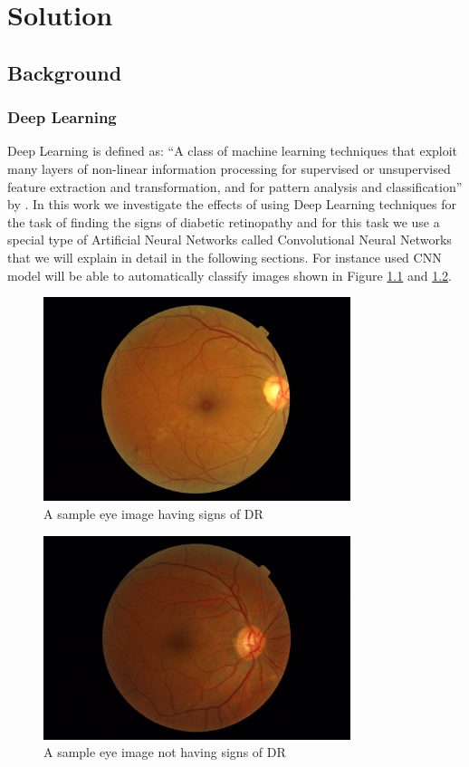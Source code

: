 \chapter{Solution}

\section{Background}
\subsection{Deep Learning}
Deep Learning is defined as:
``A class of machine learning techniques that exploit many layers of non-linear information processing for supervised or unsupervised feature extraction and transformation, and for pattern analysis and classification''
by \citet[][\emph{Deep Learning Methods and Applications}]{deng2014deep}. In this work we investigate the effects of using Deep Learning techniques for the task of finding the signs of diabetic retinopathy and for this task we use a special type of Artificial Neural Networks called Convolutional Neural Networks that we will explain in detail in the following sections. For instance used CNN model will be able to automatically classify images shown in Figure \ref{figDR} and \ref{fignoDR}.

\begin{figure}[t]
\centering
\includegraphics[width=0.8\textwidth]{Figures/DR}
\caption{A sample eye image having signs of DR}
\label{figDR}
\end{figure}

\begin{figure}[t]
\centering
\includegraphics[width=0.8\textwidth]{Figures/NODR}
\caption{A sample eye image not having signs of DR}
\label{fignoDR}
\end{figure}

